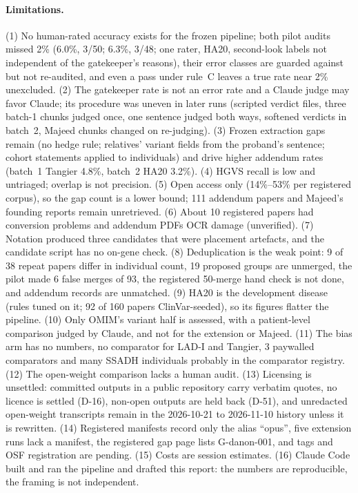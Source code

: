 \documentclass{article} %
\begin{document}
\paragraph{Limitations.} (1) No human-rated accuracy exists for the frozen pipeline; both pilot audits missed 2\% (6.0\%, 3/50; 6.3\%, 3/48; one rater, HA20, second-look labels not independent of the gatekeeper's reasons), their error classes are guarded against but not re-audited, and even a pass under rule~C leaves a true rate near 2\% unexcluded. (2) The gatekeeper rate is not an error rate and a Claude judge may favor Claude; its procedure was uneven in later runs (scripted verdict files, three batch-1 chunks judged once, one sentence judged both ways, softened verdicts in batch~2, Majeed chunks changed on re-judging). (3) Frozen extraction gaps remain (no hedge rule; relatives' variant fields from the proband's sentence; cohort statements applied to individuals) and drive higher addendum rates (batch~1 Tangier 4.8\%, batch~2 HA20 3.2\%). (4) HGVS recall is low and untriaged; overlap is not precision. (5) Open access only (14\%--53\% per registered corpus), so the gap count is a lower bound; 111 addendum papers and Majeed's founding reports remain unretrieved. (6) About 10 registered papers had conversion problems and addendum PDFs OCR damage (unverified). (7) Notation produced three candidates that were placement artefacts, and the candidate script has no on-gene check. (8) Deduplication is the weak point: 9 of 38 repeat papers differ in individual count, 19 proposed groups are unmerged, the pilot made 6 false merges of 93, the registered 50-merge hand check is not done, and addendum records are unmatched. (9) HA20 is the development disease (rules tuned on it; 92 of 160 papers ClinVar-seeded), so its figures flatter the pipeline. (10) Only OMIM's variant half is assessed, with a patient-level comparison judged by Claude, and not for the extension or Majeed. (11) The bias arm has no numbers, no comparator for LAD-I and Tangier, 3 paywalled comparators and many SSADH individuals probably in the comparator registry. (12) The open-weight comparison lacks a human audit. (13) Licensing is unsettled: committed outputs in a public repository carry verbatim quotes, no licence is settled (D-16), non-open outputs are held back (D-51), and unredacted open-weight transcripts remain in the 2026-10-21 to 2026-11-10 history unless it is rewritten. (14) Registered manifests record only the alias ``opus'', five extension runs lack a manifest, the registered gap page lists G-danon-001, and tags and OSF registration are pending. (15) Costs are session estimates. (16) Claude Code built and ran the pipeline and drafted this report: the numbers are reproducible, the framing is not independent.
\end{document}

